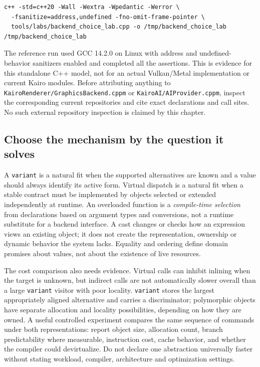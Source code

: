 \begin{verbatim}
c++ -std=c++20 -Wall -Wextra -Wpedantic -Werror \
  -fsanitize=address,undefined -fno-omit-frame-pointer \
  tools/labs/backend_choice_lab.cpp -o /tmp/backend_choice_lab
/tmp/backend_choice_lab
\end{verbatim}

The reference run used GCC 14.2.0 on Linux with address and undefined-behavior sanitizers enabled and completed all the assertions. This is evidence for this standalone C++ model, not for an actual Vulkan/Metal implementation or current Kairo modules. Before attributing anything to \texttt{KairoRenderer/GraphicsBackend.cppm} or \texttt{KairoAI/AIProvider.cppm}, inspect the corresponding current repositories and cite exact declarations and call sites. No such external repository inspection is claimed by this chapter.

\subsection{Choose the mechanism by the question it solves}\label{01-foundations-i-ch004-choose-the-mechanism-by-the-question-it-solves}

A \texttt{variant} is a natural fit when the supported alternatives are known and a value should always identify its active form. Virtual dispatch is a natural fit when a stable contract must be implemented by objects selected or extended independently at runtime. An overloaded function is a \emph{compile-time selection} from declarations based on argument types and conversions, not a runtime substitute for a backend interface. A cast changes or checks how an expression views an existing object; it does not create the representation, ownership or dynamic behavior the system lacks. Equality and ordering define domain promises about values, not about the existence of live resources.

The cost comparison also needs evidence. Virtual calls can inhibit inlining when the target is unknown, but indirect calls are not automatically slower overall than a large \texttt{variant} visitor with poor locality. \texttt{variant} stores the largest appropriately aligned alternative and carries a discriminator; polymorphic objects have separate allocation and locality possibilities, depending on how they are owned. A useful controlled experiment compares the same sequence of commands under both representations: report object size, allocation count, branch predictability where measurable, instruction cost, cache behavior, and whether the compiler could devirtualize. Do not declare one abstraction universally faster without stating workload, compiler, architecture and optimization settings.

